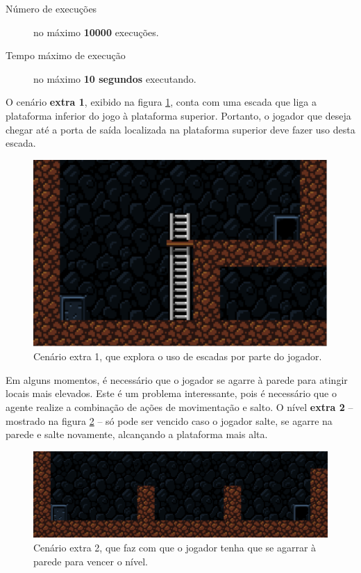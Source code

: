 \begin{description}
    \item [Número de execuções] no máximo \textbf{10000} execuções.
    \item [Tempo máximo de execução] no máximo \textbf{10 segundos} executando.
\end{description}

O cenário \textbf{extra 1}, exibido na figura \ref{fig:extra1}, conta com uma
escada que liga a plataforma inferior do jogo à plataforma superior. Portanto,
o jogador que deseja chegar até a porta de saída localizada na plataforma
superior deve fazer uso desta escada.

\begin{figure}[H]
\centering
\includegraphics[width=\textwidth / 2]{fig/levels/extra1.pdf}
\caption{Cenário extra 1, que explora o uso de escadas por parte do jogador.}
\label{fig:extra1}
\end{figure}

Em alguns momentos, é necessário que o jogador se agarre à parede para atingir
locais mais elevados. Este é um problema interessante, pois é necessário que o
agente realize a combinação de ações de movimentação e salto. O nível
\textbf{extra 2} -- mostrado na figura \ref{fig:extra2} -- só pode ser vencido
caso o jogador salte, se agarre na parede e salte novamente, alcançando a
plataforma mais alta.

\begin{figure}[H]
\centering
\includegraphics[width=\textwidth / 2]{fig/levels/extra2.pdf}
\caption{Cenário extra 2, que faz com que o jogador tenha que se agarrar à
    parede para vencer o nível.}
\label{fig:extra2}
\end{figure}


